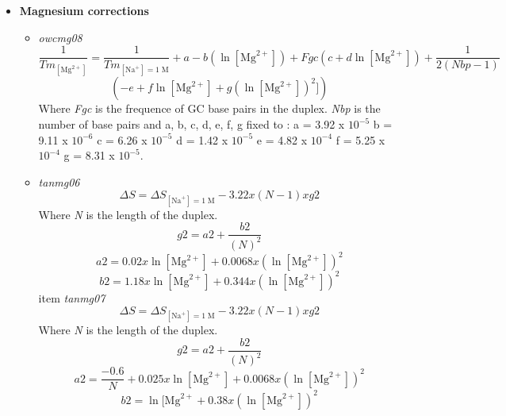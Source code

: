 \documentclass{article}
\begin{document}
\begin{itemize}
\item \textbf{Magnesium corrections}
  \begin{itemize}
  \item \textit{owcmg08}
 \begin{displaymath}
 \frac{1}{Tm_{[\mbox{Mg}^{2+}]}} = \frac{1}{Tm_{[\mbox{Na}^+]=1\;\mathrm{M}}} + a
 - b (\ln [\mbox{Mg}^{2+}]) + Fgc (c + d \ln [\mbox{Mg}^{2+}]) + \frac{1}{2 (Nbp-1)} 
 \end{displaymath}
 \begin{displaymath}
 (-e + f \ln [\mbox{Mg}^{2+}] + g (\ln [\mbox{Mg}^{2+}])^{2}])
 \end{displaymath}
 Where \emph{Fgc} is the frequence of GC base pairs in the duplex.
 \emph{Nbp} is the number of base pairs
 and a, b, c, d, e, f, g fixed to :
 a = 3.92 x $10^{-5}$
 b = 9.11 x $10^{-6}$
 c = 6.26 x $10^{-5}$
 d = 1.42 x $10^{-5}$
 e = 4.82 x $10^{-4}$
 f = 5.25 x $10^{-4}$
 g = 8.31 x $10^{-5}$.
 \item \textit{tanmg06}
 \begin{displaymath}
  \Delta{}S=\Delta{}S_{[\mbox{Na}^+]=1\;\mathrm{M}}- 3.22 x (N - 1) x g2  
 \end{displaymath}
 Where \emph{N} is the length of the duplex.
 \begin{displaymath}
  g2=a2 + \frac{b2}{(N)^2}  
 \end{displaymath}
 \begin{displaymath}
  a2= 0.02 x \ln [\mbox{Mg}^{2+}] + 0.0068 x (\ln [\mbox{Mg}^{2+}])^2  
 \end{displaymath}
 \begin{displaymath}
  b2= 1.18 x \ln [\mbox{Mg}^{2+}] + 0.344 x (\ln [\mbox{Mg}^{2+}])^2
 \end{displaymath}
 item \textit{tanmg07}
 \begin{displaymath}
  \Delta{}S=\Delta{}S_{[\mbox{Na}^+]=1\;\mathrm{M}}- 3.22 x (N - 1) x g2  
 \end{displaymath}
 Where \emph{N} is the length of the duplex.
 \begin{displaymath}
  g2=a2 + \frac{b2}{(N)^2}  
 \end{displaymath}
 \begin{displaymath}
  a2= \frac{-0.6}{N} + 0.025 x \ln [\mbox{Mg}^{2+}] + 0.0068 x (\ln [\mbox{Mg}^{2+}])^2  
 \end{displaymath}
 \begin{displaymath}
  b2= \ln [\mbox{Mg}^{2+} + 0.38 x (\ln [\mbox{Mg}^{2+}])^2  
 \end{displaymath}
 \end{itemize}
 

\end{itemize}
\end{document}
